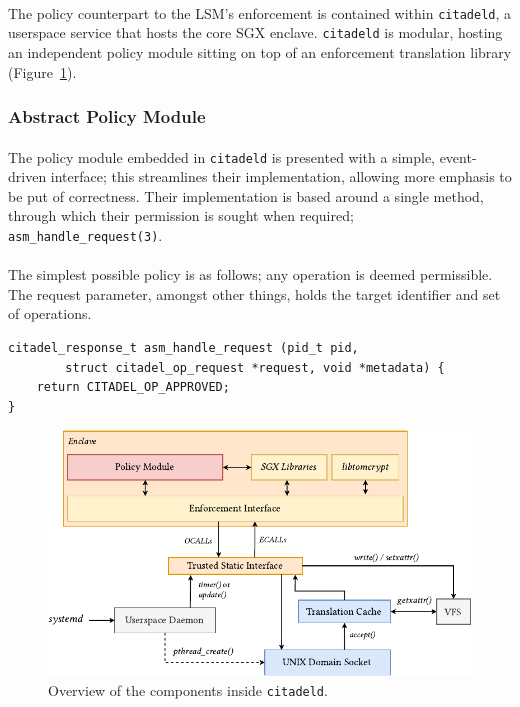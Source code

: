 \paragraph{} The policy counterpart to the LSM's enforcement is contained within \texttt{citadeld}, a userspace service that hosts the core SGX enclave. \texttt{citadeld} is modular, hosting an independent policy module sitting on top of an enforcement translation library (Figure~\ref{fig:policy-enclave}).

\subsubsection{Abstract Policy Module}
\paragraph{} The policy module embedded in \texttt{citadeld} is presented with a simple, event-driven interface; this streamlines their implementation, allowing more emphasis to be put of correctness. Their implementation is based around a single method, through which their permission is sought when required; \texttt{asm\_handle\_request(3)}.


\paragraph{} The simplest possible policy is as follows; any operation is deemed permissible. The request parameter, amongst other things, holds the target identifier and set of operations. 

\vspace{3mm}
\begin{verbatim}
citadel_response_t asm_handle_request (pid_t pid, 
        struct citadel_op_request *request, void *metadata) {
    return CITADEL_OP_APPROVED;
}
\end{verbatim}

\begin{figure}[]
    \centering
    \includegraphics[width=0.9\linewidth]{figures/EnclaveLayout.pdf}
    \caption{Overview of the components inside \texttt{citadeld}.}
    \label{fig:policy-enclave}
\end{figure}

